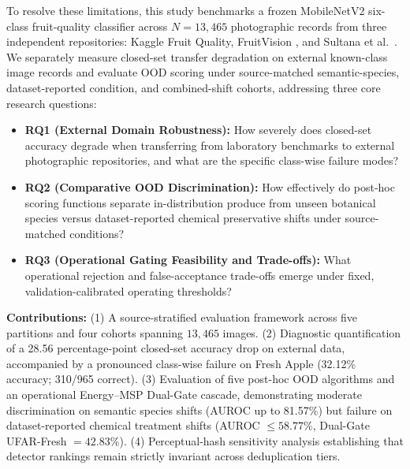 To resolve these limitations, this study benchmarks a frozen MobileNetV2 six-class fruit-quality classifier across $N = 13,465$ photographic records from three independent repositories: Kaggle Fruit Quality, FruitVision \cite{bijoy2025fruitvision}, and Sultana et al.\ \cite{sultana2022extensive}. We separately measure closed-set transfer degradation on external known-class image records and evaluate OOD scoring under source-matched semantic-species, dataset-reported condition, and combined-shift cohorts, addressing three core research questions:
\begin{itemize}
\setlength{\itemsep}{0pt}\setlength{\parsep}{0pt}\setlength{\parskip}{0pt}\setlength{\topsep}{1pt}\setlength{\partopsep}{0pt}
\item \textbf{RQ1 (External Domain Robustness):} How severely does closed-set accuracy degrade when transferring from laboratory benchmarks to external photographic repositories, and what are the specific class-wise failure modes?
\item \textbf{RQ2 (Comparative OOD Discrimination):} How effectively do post-hoc scoring functions separate in-distribution produce from unseen botanical species versus dataset-reported chemical preservative shifts under source-matched conditions?
\item \textbf{RQ3 (Operational Gating Feasibility and Trade-offs):} What operational rejection and false-acceptance trade-offs emerge under fixed, validation-calibrated operating thresholds?
\end{itemize}

\noindent\textbf{Contributions:} (1) A source-stratified evaluation framework across five partitions and four cohorts spanning $13,465$ images. (2) Diagnostic quantification of a 28.56 percentage-point closed-set accuracy drop on external data, accompanied by a pronounced class-wise failure on Fresh Apple (32.12\% accuracy; 310/965 correct). (3) Evaluation of five post-hoc OOD algorithms and an operational Energy--MSP Dual-Gate cascade, demonstrating moderate discrimination on semantic species shifts (AUROC up to 81.57\%) but failure on dataset-reported chemical treatment shifts (AUROC $\le 58.77\%$, Dual-Gate UFAR-Fresh $= 42.83\%$). (4) Perceptual-hash sensitivity analysis establishing that detector rankings remain strictly invariant across deduplication tiers.
